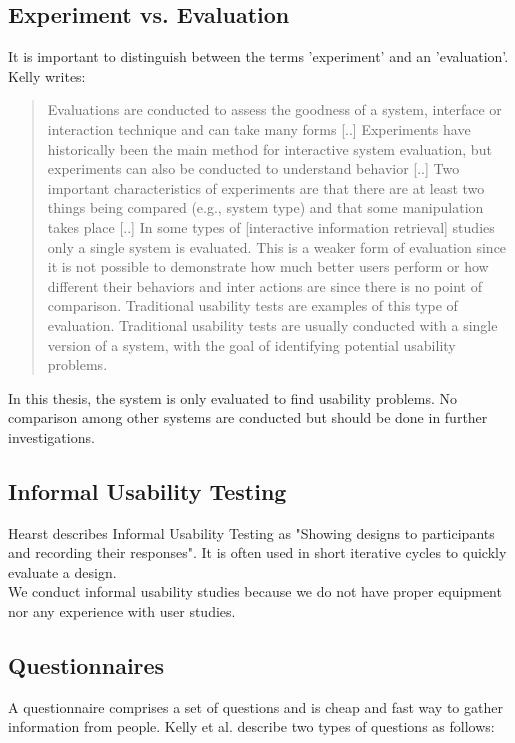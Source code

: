 \documentclass[11pt]{report}
\begin{document}
\subsection{Experiment vs. Evaluation}

It is important to distinguish between the terms 'experiment' and an 'evaluation'. Kelly \cite{Kelly2007} writes:
\begin{quote}
Evaluations are conducted to assess the goodness of a system, interface or interaction technique and can take many forms [..] Experiments have historically been the main method for interactive system evaluation, but experiments can also be conducted to understand behavior [..] Two important characteristics of experiments are that there are at least two things being compared (e.g., system type) and that some manipulation takes place [..] In some types of [interactive information retrieval] studies only a single system is evaluated. This is a weaker form of evaluation since it is not possible to demonstrate how much better users perform or how different their behaviors and inter actions are since there is no point of comparison. Traditional usability tests are examples of this type of evaluation. Traditional usability tests are usually conducted with a single version of a system, with the goal of identifying potential usability problems.	
\end{quote}

In this thesis, the system is only evaluated to find usability problems. No comparison among other systems are conducted but should be done in further investigations.

\subsection{Informal Usability Testing}

Hearst \cite{Hearst2009} describes Informal Usability Testing as "Showing designs to participants and recording their responses". It is often used in short iterative cycles to quickly evaluate a design. \\

 We conduct informal usability studies because we do not have proper equipment nor any experience with user studies.

\subsection{Questionnaires}

A questionnaire comprises a set of questions and is cheap and fast way to gather information from people. Kelly et al. \cite{Kelly2008} describe two types of questions as follows:
\end{document}

